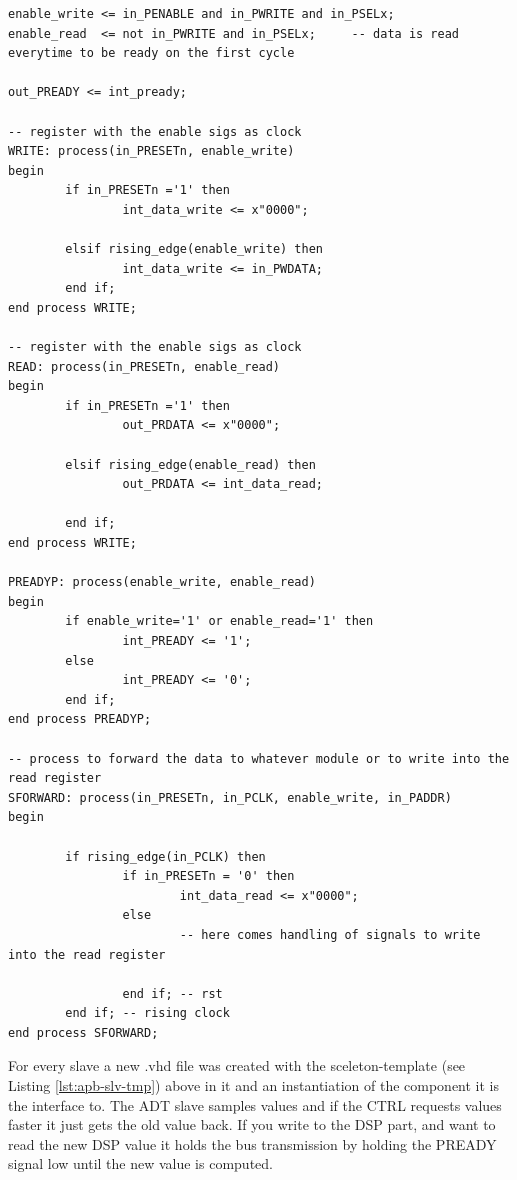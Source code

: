 \documentclass[%
	a4paper,
]
{article}
\begin{document}
\begin{lstlisting}
enable_write <= in_PENABLE and in_PWRITE and in_PSELx;
enable_read  <= not in_PWRITE and in_PSELx;     -- data is read everytime to be ready on the first cycle

out_PREADY <= int_pready;

-- register with the enable sigs as clock
WRITE: process(in_PRESETn, enable_write)
begin
        if in_PRESETn ='1' then
                int_data_write <= x"0000";

        elsif rising_edge(enable_write) then
                int_data_write <= in_PWDATA;
        end if;
end process WRITE;

-- register with the enable sigs as clock
READ: process(in_PRESETn, enable_read)
begin
        if in_PRESETn ='1' then
                out_PRDATA <= x"0000";

        elsif rising_edge(enable_read) then
                out_PRDATA <= int_data_read;

        end if;
end process WRITE;

PREADYP: process(enable_write, enable_read)
begin
        if enable_write='1' or enable_read='1' then
                int_PREADY <= '1';
        else
                int_PREADY <= '0';
        end if;
end process PREADYP;

-- process to forward the data to whatever module or to write into the read register
SFORWARD: process(in_PRESETn, in_PCLK, enable_write, in_PADDR)
begin

        if rising_edge(in_PCLK) then
                if in_PRESETn = '0' then
                        int_data_read <= x"0000";
                else
                        -- here comes handling of signals to write into the read register

                end if; -- rst
        end if; -- rising clock
end process SFORWARD;
\end{lstlisting}

For every slave a new .vhd file was created with the sceleton-template 
(see Listing \ref{lst:apb-slv-tmp}) above in it and an 
instantiation of the component it is the interface to. The ADT slave samples values
and if the CTRL requests values faster it just gets the old value back. If you write
to the DSP part, and want to read the new DSP value it holds the bus transmission by 
holding the PREADY signal low until the new value is computed.
\end{document}
